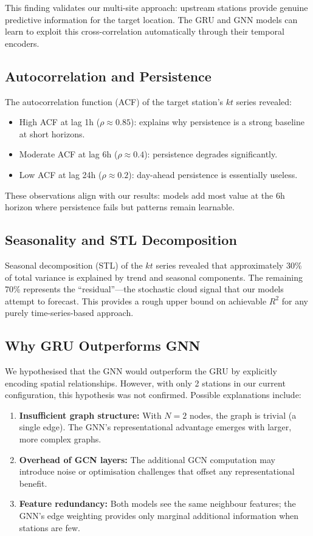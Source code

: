\documentclass[11pt,a4paper]{article}
\begin{document}
This finding validates our multi-site approach: upstream stations provide genuine predictive information for the target location. The GRU and GNN models can learn to exploit this cross-correlation automatically through their temporal encoders.

\subsection{Autocorrelation and Persistence}

The autocorrelation function (ACF) of the target station's $kt$ series revealed:
\begin{itemize}[noitemsep]
    \item High ACF at lag 1h ($\rho \approx 0.85$): explains why persistence is a strong baseline at short horizons.
    \item Moderate ACF at lag 6h ($\rho \approx 0.4$): persistence degrades significantly.
    \item Low ACF at lag 24h ($\rho \approx 0.2$): day-ahead persistence is essentially useless.
\end{itemize}

These observations align with our results: models add most value at the 6h horizon where persistence fails but patterns remain learnable.

\subsection{Seasonality and STL Decomposition}

Seasonal decomposition (STL) of the $kt$ series revealed that approximately 30\% of total variance is explained by trend and seasonal components. The remaining 70\% represents the ``residual''---the stochastic cloud signal that our models attempt to forecast. This provides a rough upper bound on achievable $R^2$ for any purely time-series-based approach.

\subsection{Why GRU Outperforms GNN}

We hypothesised that the GNN would outperform the GRU by explicitly encoding spatial relationships. However, with only 2 stations in our current configuration, this hypothesis was not confirmed. Possible explanations include:

\begin{enumerate}[noitemsep]
    \item \textbf{Insufficient graph structure:} With $N = 2$ nodes, the graph is trivial (a single edge). The GNN's representational advantage emerges with larger, more complex graphs.
    \item \textbf{Overhead of GCN layers:} The additional GCN computation may introduce noise or optimisation challenges that offset any representational benefit.
    \item \textbf{Feature redundancy:} Both models see the same neighbour features; the GNN's edge weighting provides only marginal additional information when stations are few.
\end{enumerate}
\end{document}
